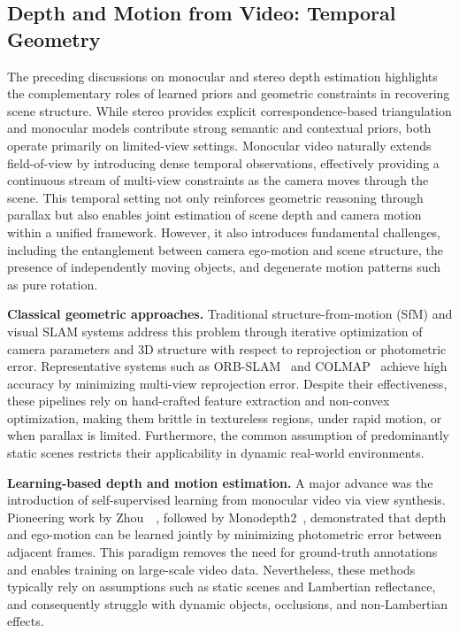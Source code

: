 \subsection{Depth and Motion from Video: Temporal Geometry}
The preceding discussions on monocular and stereo depth estimation highlights the complementary roles of learned priors and geometric constraints in recovering scene structure.
While stereo provides explicit correspondence-based triangulation and monocular models contribute strong semantic and contextual priors, both operate primarily on limited-view settings.
Monocular video naturally extends field-of-view by introducing dense temporal observations, effectively providing a continuous stream of multi-view constraints as the camera moves through the scene.
This temporal setting not only reinforces geometric reasoning through parallax but also enables joint estimation of scene depth and camera motion within a unified framework.
However, it also introduces fundamental challenges, including the entanglement between camera ego-motion and scene structure, the presence of independently moving objects, and degenerate motion patterns such as pure rotation.

\noindent\textbf{Classical geometric approaches.} Traditional structure-from-motion (SfM) and visual SLAM systems address this problem through iterative optimization of camera parameters and 3D structure with respect to reprojection or photometric error.
Representative systems such as ORB-SLAM~\cite{murAcceptedTRO2015} and COLMAP~\cite{schoenberger2016sfm} achieve high accuracy by minimizing multi-view reprojection error.
Despite their effectiveness, these pipelines rely on hand-crafted feature extraction and non-convex optimization, making them brittle in textureless regions, under rapid motion, or when parallax is limited.
Furthermore, the common assumption of predominantly static scenes restricts their applicability in dynamic real-world environments.

\noindent\textbf{Learning-based depth and motion estimation.} A major advance was the introduction of self-supervised learning from monocular video via view synthesis.
Pioneering work by Zhou~\etal~\cite{zhou2017unsupervised}, followed by Monodepth2~\cite{godard2019digging}, demonstrated that depth and ego-motion can be learned jointly by minimizing photometric error between adjacent frames.
This paradigm removes the need for ground-truth annotations and enables training on large-scale video data.
Nevertheless, these methods typically rely on assumptions such as static scenes and Lambertian reflectance, and consequently struggle with dynamic objects, occlusions, and non-Lambertian effects.

